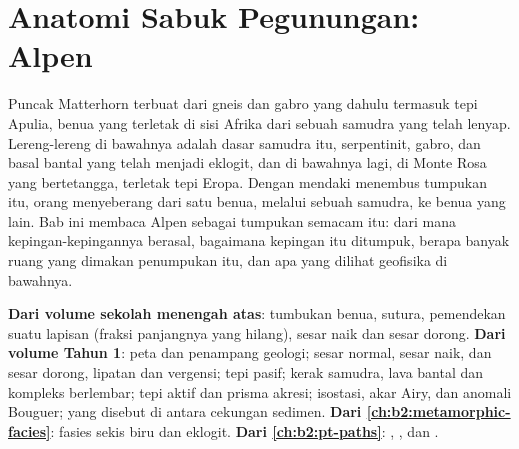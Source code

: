 \chapter{Anatomi Sabuk Pegunungan: Alpen}\label{ch:b2:alpine-orogen}

Puncak Matterhorn terbuat dari gneis dan gabro yang dahulu termasuk tepi
Apulia, benua yang terletak di sisi Afrika dari sebuah samudra yang telah lenyap. Lereng-lereng di bawahnya
adalah dasar samudra itu, serpentinit, gabro, dan basal bantal yang telah menjadi eklogit, dan
di bawahnya lagi, di Monte Rosa yang bertetangga, terletak tepi Eropa. Dengan mendaki menembus
tumpukan itu, orang menyeberang dari satu benua, melalui sebuah samudra, ke benua yang lain. Bab ini membaca Alpen sebagai tumpukan semacam itu: dari mana kepingan-kepingannya berasal, bagaimana kepingan itu
ditumpuk, berapa banyak ruang yang dimakan penumpukan itu, dan apa yang dilihat geofisika di bawahnya.

\begin{recall}
\textbf{Dari volume sekolah menengah atas}: tumbukan benua, sutura, pemendekan suatu
lapisan (fraksi panjangnya yang hilang), sesar naik dan sesar dorong. \textbf{Dari volume
Tahun 1}: peta dan penampang geologi; sesar normal, sesar naik, dan sesar dorong, lipatan dan
vergensi; tepi pasif; kerak samudra, lava bantal dan kompleks  berlembar;
tepi aktif dan prisma akresi; isostasi, akar Airy, dan anomali Bouguer;
 yang disebut di antara cekungan sedimen. \textbf{Dari
\cref{ch:b2:metamorphic-facies}}: fasies sekis biru dan eklogit. \textbf{Dari
\cref{ch:b2:pt-paths}}: , , dan .
\end{recall}

